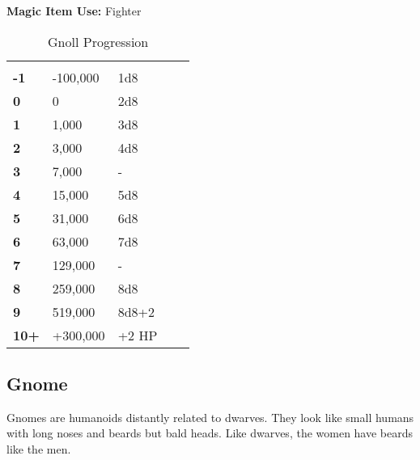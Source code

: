 \begin{multicols*}{2}
{\textbf{Magic Item Use:} Fighter}

\begin {table}[H]
  \caption{Gnoll Progression}
  \begin{tabularx}{\columnwidth}{>{\bfseries}YYYYY}
	 &  & \\
	-1 & -100,000 & 1d8\\
	0 & 0 & 2d8\\
	1 & 1,000 & 3d8\\
	2 & 3,000 & 4d8\\
	3 & 7,000 & -\\
	4 & 15,000 & 5d8\\
	5 & 31,000 & 6d8\\
	6 & 63,000 & 7d8\\
	7 & 129,000 & -\\
	8 & 259,000 & 8d8\\
	9 & 519,000 & 8d8+2\\
	10+ & +300,000 & +2 HP
  \end {tabularx}
\end {table}

\subsection{Gnome}

Gnomes are humanoids distantly related to dwarves. They look like small humans with long noses and beards but bald heads. Like dwarves, the women have beards like the men.


\end{multicols*}
